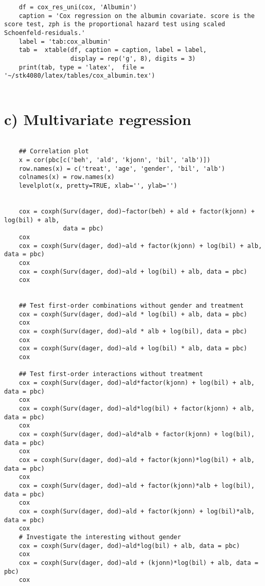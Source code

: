 \documentclass[11pt,a4paper]{article}
\begin{document}
\begin{appendices}
\begin{verbatim}
    df = cox_res_uni(cox, 'Albumin')
    caption = 'Cox regression on the albumin covariate. score is the score test, zph is the proportional hazard test using scaled Schoenfeld-residuals.'
    label = 'tab:cox_albumin'
    tab =  xtable(df, caption = caption, label = label, 
                  display = rep('g', 8), digits = 3)
    print(tab, type = 'latex',  file = '~/stk4080/latex/tables/cox_albumin.tex')


    \end{verbatim}



    \section{c) Multivariate regression}
    \begin{verbatim}

    ## Correlation plot
    x = cor(pbc[c('beh', 'ald', 'kjonn', 'bil', 'alb')])
    row.names(x) = c('treat', 'age', 'gender', 'bil', 'alb')
    colnames(x) = row.names(x)
    levelplot(x, pretty=TRUE, xlab='', ylab='')


    cox = coxph(Surv(dager, dod)~factor(beh) + ald + factor(kjonn) + log(bil) + alb,
                data = pbc)
    cox
    cox = coxph(Surv(dager, dod)~ald + factor(kjonn) + log(bil) + alb, data = pbc)
    cox
    cox = coxph(Surv(dager, dod)~ald + log(bil) + alb, data = pbc)
    cox


    ## Test first-order combinations without gender and treatment
    cox = coxph(Surv(dager, dod)~ald * log(bil) + alb, data = pbc)
    cox 
    cox = coxph(Surv(dager, dod)~ald * alb + log(bil), data = pbc)
    cox 
    cox = coxph(Surv(dager, dod)~ald + log(bil) * alb, data = pbc)
    cox 

    ## Test first-order interactions without treatment
    cox = coxph(Surv(dager, dod)~ald*factor(kjonn) + log(bil) + alb, data = pbc)
    cox 
    cox = coxph(Surv(dager, dod)~ald*log(bil) + factor(kjonn) + alb, data = pbc)
    cox 
    cox = coxph(Surv(dager, dod)~ald*alb + factor(kjonn) + log(bil), data = pbc)
    cox 
    cox = coxph(Surv(dager, dod)~ald + factor(kjonn)*log(bil) + alb, data = pbc)
    cox 
    cox = coxph(Surv(dager, dod)~ald + factor(kjonn)*alb + log(bil), data = pbc)
    cox 
    cox = coxph(Surv(dager, dod)~ald + factor(kjonn) + log(bil)*alb, data = pbc)
    cox 
    # Investigate the interesting without gender 
    cox = coxph(Surv(dager, dod)~ald*log(bil) + alb, data = pbc)
    cox 
    cox = coxph(Surv(dager, dod)~ald + (kjonn)*log(bil) + alb, data = pbc)
    cox 



\end{verbatim}
\end{appendices}
\end{document}
